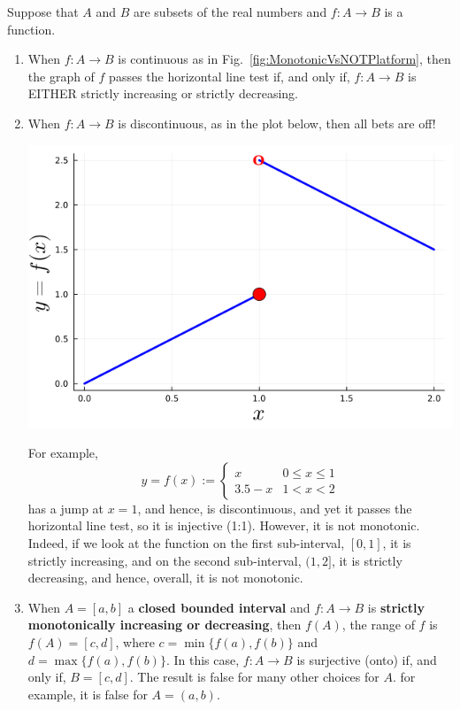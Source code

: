 \begin{rem} 
\label{rem:EquivalentInjectiveTests} Suppose that $A$ and $B$ are subsets of the real numbers and $f:A \to B$ is a function.
\begin{enumerate}
\renewcommand{\labelenumi}{(\alph{enumi})}
\setlength{\itemsep}{.2cm}
    \item When $f:A \to B$ is continuous as in Fig.~\ref{fig:MonotonicVsNOTPlatform}, then the graph of $f$ passes the horizontal line test if, and only if, $f:A \to B$ is EITHER strictly increasing or strictly decreasing. 
    \item When $f:A \to B$ is discontinuous, as in the plot below, then all bets are off! 
    \begin{center}
    \includegraphics[width=0.40\columnwidth]{graphics/Chap01/injectiveDiscontinuousFunction.png}%
\end{center}
For example, 
$$ y=f(x):= \begin{cases}
    x &  0 \le x \le 1 \\
    3.5 - x & 1 < x < 2
\end{cases}$$
has a jump at $x = 1$, and hence, is discontinuous, and yet it passes the horizontal line test, so it is injective (1:1). However, it is not monotonic. Indeed, if we look at the function on the first sub-interval, $[0, 1]$, it is strictly increasing, and on the second sub-interval, $(1, 2]$, it is strictly decreasing, and hence, overall, it is not monotonic.\\

    \item When $A = [a, b]$ a \textbf{closed bounded interval} and $f:A \to B$ is \textbf{strictly monotonically increasing or decreasing}, then $f(A)$, the range of $f$ is
    $f(A) = [c, d] $, where $c = \min\{f(a), f(b)\}$ and  $d = \max\{f(a), f(b)\}$.  In this case, $f:A \to B$ is surjective (onto) if, and only if, $B = [c, d]$. The result is false for many other choices for $A$. for example, it is false for $A = (a,b)$.
\end{enumerate}

\end{rem}

